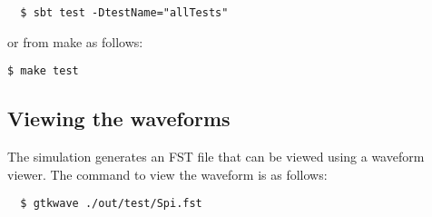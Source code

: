 \begin{verbatim}
  $ sbt test -DtestName="allTests"
\end{verbatim}

or from make as follows:

\texttt{\$ make test}

\subsection{Viewing the waveforms}

The simulation generates an FST file that can be viewed using a waveform viewer. The command to view the waveform is as follows:
\begin{verbatim}
  $ gtkwave ./out/test/Spi.fst
\end{verbatim}
